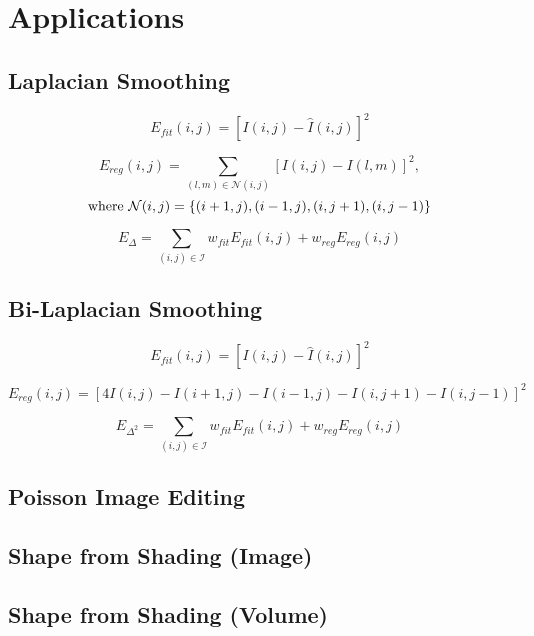 \section{Applications}
\label{sec:apps}

\subsection{Laplacian Smoothing} 
$$E_{\mathit{fit}}(i,j) = [I(i,j) - \hat{I}(i,j) ]^2$$

$$E_{\mathit{reg}}(i,j) = \sum_{(l,m) \in \mathcal{N}(i,j)} [I(i,j) - I(l,m) ]^2,$$
$$\textnormal{where}\ \mathcal{N}(i,j) = \{(i+1,j), (i-1,j), (i,j+1), (i,j-1)\}$$

$$E_{\Delta} = \sum_{(i,j) \in \mathcal{I}} w_{\mathit{fit}} E_{\mathit{fit}}(i,j) + w_{\mathit{reg}} E_{\mathit{reg}}(i,j)$$

\subsection{Bi-Laplacian Smoothing}

$$E_{\mathit{fit}}(i,j) = [I(i,j) - \hat{I}(i,j) ]^2$$

$$E_{\mathit{reg}}(i,j) = [4 I(i,j) - I(i+1,j) - I(i-1,j) - I(i,j+1) - I(i,j-1)]^2$$

$$E_{\Delta^2} = \sum_{(i,j) \in \mathcal{I}} w_{\mathit{fit}} E_{\mathit{fit}}(i,j) + w_{\mathit{reg}} E_{\mathit{reg}}(i,j)$$

\subsection{Poisson Image Editing}

\cite{perez2003poisson}

\subsection{Shape from Shading (Image)}

\cite{wu2014sfs}

\subsection{Shape from Shading (Volume)}

